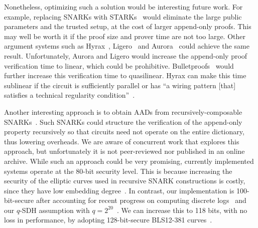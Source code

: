 Nonetheless, optimizing such a solution would be interesting future work.
For example, replacing SNARKs with STARKs~\cite{stark} would eliminate the large public parameters and the trusted setup, at the cost of larger append-only proofs.
This may well be worth it if the proof size and prover time are not too large.
Other argument systems such as Hyrax~\cite{hyrax}, Ligero~\cite{ligero} and Aurora~\cite{aurora} could achieve the same result.
Unfortunately, Aurora and Ligero would increase the append-only proof verification time to linear, which could be prohibitive.
Bulletproofs~\cite{bulletproofs} would further increase this verification time to quasilinear.
Hyrax can make this time sublinear if the circuit is sufficiently parallel or has ``a wiring pattern [that] satisfies a technical regularity condition''~\cite{hyrax}.

Another interesting approach is to obtain AADs from recursively-composable SNARKs~\cite{cycles-of-ec,BitanskyCanettiChiesaTromer2013}.
Such SNARKs could structure the verification of the append-only property recursively so that circuits need not operate on the entire dictionary, thus lowering overheads.
We are aware of concurrent work that explores this approach, but unfortunately it is not peer-reviewed nor published in an online archive.
While such an approach could be very promising, currently implemented systems operate at the 80-bit security level.
This is because increasing the security of the elliptic curves used in recursive SNARK constructions is costly, since they have low embedding degree~\cite{cycles-of-ec}.
In contrast, our implementation is 100-bit-secure after accounting for recent progress on computing discrete logs~\cite{MenezesSarkarSingh2017} and our $q$-SDH assumption with $q=2^{20}$~\cite{BonehBoyen2008}.
We can increase this to 118 bits, with no loss in performance, by adopting 128-bit-secure BLS12-381 curves~\cite{bls12-381-switch}.
